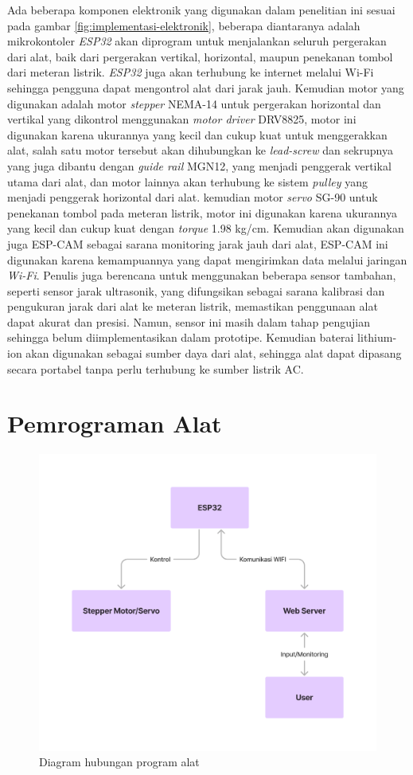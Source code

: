 Ada beberapa komponen elektronik yang digunakan dalam penelitian ini sesuai pada gambar \ref{fig:implementasi-elektronik},
beberapa diantaranya adalah
mikrokontoler \textit{ESP32} akan diprogram untuk menjalankan seluruh pergerakan dari alat, baik dari
pergerakan vertikal, horizontal, maupun penekanan tombol dari meteran listrik. \textit{ESP32} juga akan
terhubung ke internet melalui Wi-Fi sehingga pengguna dapat mengontrol alat dari jarak jauh. 
Kemudian motor yang digunakan
adalah motor \textit{stepper} NEMA-14 untuk pergerakan horizontal dan vertikal yang dikontrol menggunakan
\textit{motor driver} DRV8825, motor ini digunakan karena
ukurannya yang kecil dan cukup kuat untuk menggerakkan alat, salah satu motor tersebut akan dihubungkan
ke \textit{lead-screw} dan sekrupnya yang juga dibantu dengan \textit{guide rail} MGN12, 
yang menjadi penggerak vertikal utama dari alat, dan motor lainnya
akan terhubung ke sistem \textit{pulley} yang menjadi penggerak horizontal dari alat. kemudian motor 
\textit{servo} SG-90 untuk penekanan tombol pada meteran listrik, motor ini digunakan karena ukurannya 
yang kecil dan cukup kuat dengan \textit{torque} 1.98 kg/cm. 
Kemudian akan digunakan juga ESP-CAM sebagai sarana monitoring jarak jauh
dari alat, ESP-CAM ini digunakan karena kemampuannya yang dapat mengirimkan 
data melalui jaringan \textit{Wi-Fi}.
Penulis juga berencana untuk menggunakan beberapa sensor tambahan, seperti sensor jarak ultrasonik,
yang difungsikan sebagai sarana kalibrasi dan pengukuran jarak dari alat ke meteran listrik,
memastikan penggunaan alat dapat akurat dan presisi. Namun, sensor ini masih dalam tahap pengujian
sehingga belum diimplementasikan dalam prototipe. Kemudian baterai lithium-ion akan digunakan sebagai
sumber daya dari alat, sehingga alat dapat dipasang secara portabel tanpa perlu terhubung ke sumber listrik AC.

\section{Pemrograman Alat}

\begin{figure}[H]
  \centering
  \includegraphics[width=0.8\linewidth]{gambar/diagram-program.png}
  \caption{Diagram hubungan program alat}
  \label{fig:diagram-program}
\end{figure}

